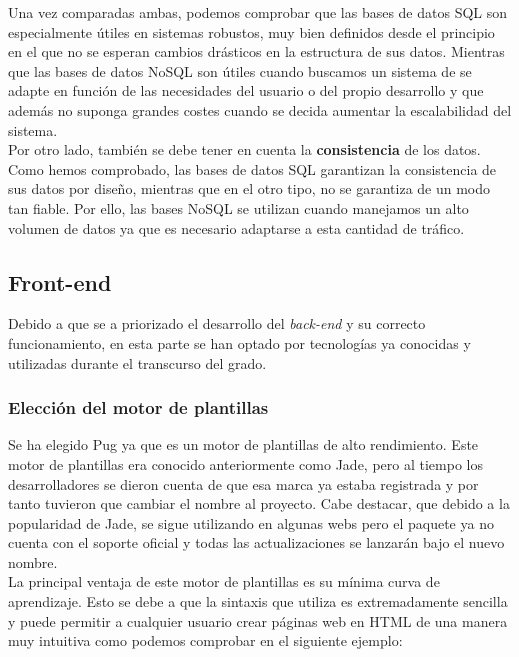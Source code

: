 Una vez comparadas ambas, podemos comprobar que las bases de datos SQL son especialmente útiles en sistemas robustos, muy bien definidos desde el principio
en el que no se esperan cambios drásticos en la estructura de sus datos. Mientras que las bases de datos NoSQL son útiles cuando buscamos un sistema de se adapte en función de las necesidades del usuario o del propio desarrollo y que además no suponga grandes costes cuando se decida aumentar la escalabilidad del sistema.\\

Por otro lado, también se debe tener en cuenta la \textbf{consistencia} de los datos. Como hemos comprobado, las bases de datos SQL garantizan la consistencia de sus datos por diseño, mientras que en el otro tipo, no se garantiza de un modo tan fiable. Por ello, las bases NoSQL se utilizan cuando manejamos un alto volumen de datos ya que es necesario adaptarse a esta cantidad de tráfico. 


\subsection{Front-end}

Debido a que se a priorizado el desarrollo del \textit{back-end} y su correcto funcionamiento, en esta parte se han optado por tecnologías ya conocidas y utilizadas durante el transcurso del grado.

\subsubsection{Elección del motor de plantillas}

Se ha elegido Pug\cite{pug} ya que es un motor de plantillas de alto rendimiento. Este motor de plantillas era conocido anteriormente como Jade\cite{jade}, pero al tiempo
los desarrolladores se dieron cuenta de que esa marca ya estaba registrada y por tanto tuvieron que cambiar el nombre al proyecto. Cabe destacar,
que debido a la popularidad de Jade, se sigue utilizando en algunas webs pero el paquete ya no cuenta con el soporte oficial y todas las actualizaciones se lanzarán bajo el nuevo nombre. \\

La principal ventaja de este motor de plantillas es su mínima curva de aprendizaje. Esto se debe a que la sintaxis que utiliza es extremadamente sencilla y puede permitir a cualquier usuario crear páginas web en HTML de una manera muy intuitiva como podemos comprobar en el siguiente ejemplo:

